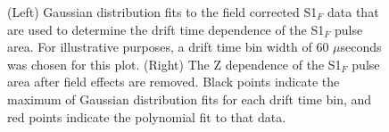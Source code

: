 \documentclass[a4paper,12pt]{article}
\begin{document}
{\begin{figure} 
\centering
{}
\qquad
{}
\caption{ (Left)  Gaussian distribution fits to the field corrected S1$_F$ data that are used to determine the drift time dependence of the S1$_F$ pulse area. For illustrative purposes, a drift time bin width of 60 $\mu$seconds was chosen for this plot. (Right) The Z dependence of the S1$_F$ pulse area after field effects are removed.  Black points indicate the maximum of Gaussian distribution fits for each drift time bin, and red points indicate the polynomial fit to that data.}
\label{fig:KrypCal_S1ZDep}
\end{figure}

}
\end{document}
